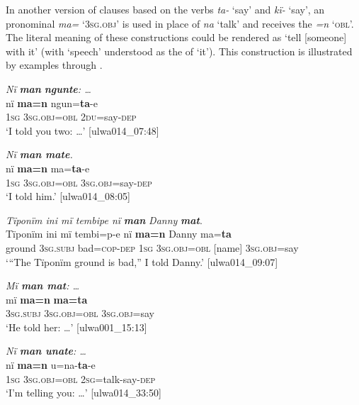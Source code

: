 In another version of  clauses based on the verbs \textit{ta-} ‘say’ and \textit{kï-} ‘say’, an  pronominal  \textit{ma=} ‘\textsc{3sg.obj}’ is used in place of \textit{na} ‘talk’ and receives the  \textit{=n} ‘\textsc{obl}’. The literal meaning of these constructions could be rendered as ‘tell [someone] with it’ (with ‘speech’ understood as the  of ‘it’). This construction is illustrated by examples  through .

\ea%
    \label{ex:syntax:207}
          \textit{Nï} \textbf{\textit{man}} \textbf{\textit{ngunte}}\textit{: …}\\
\gll    nï    \textbf{ma=n}      ngun=\textbf{ta}{}-e\\
    1\textsc{sg}  3\textsc{sg.obj=obl}  \textsc{2du}=say-\textsc{dep}\\
\glt `I told you two: …’ [ulwa014\_07:48]
\z

\ea%
    \label{ex:syntax:208}
          \textit{Nï \textbf{man mate}.}\\
\gll nï    \textbf{ma=n}      ma=\textbf{ta}{}-e\\
    1\textsc{sg}  3\textsc{sg.obj=obl}  3\textsc{sg.obj}=say-\textsc{dep}\\
\glt `I told him.’ [ulwa014\_08:05]
\z

\ea%
    \label{ex:syntax:209}
          \textit{Tïponïm ini mï tembipe nï} \textbf{\textit{man}} \textit{Danny} \textbf{\textit{mat}}.\\
\gll Tïponïm  ini    mï      tembi=p-e    nï    \textbf{ma=n} Danny  ma=\textbf{ta}\\
    [place]    ground  \textsc{3sg.subj}  bad=\textsc{cop{}-dep}  \textsc{1sg} 3\textsc{sg.obj}=\textsc{obl}     [name]  3\textsc{sg.obj=}say\\
\glt `“The Tïponïm ground is bad,” I told Danny.’ [ulwa014\_09:07]
\z

\ea%
    \label{ex:syntax:210}
          \textit{Mï \textbf{man mat}: …}\\
\gll    mï      \textbf{ma=n}      \textbf{ma=ta}\\
    3\textsc{sg.subj}  \textsc{3sg.obj=obl}  \textsc{3sg.obj}=say\\
\glt `He told her: …’ [ulwa001\_15:13]
\z

\ea%
    \label{ex:syntax:211}
          \textit{Nï \textbf{man unate}: …}\\
\gll nï    \textbf{ma=n}      u=na-\textbf{ta}-e\\
    1\textsc{sg}  \textsc{3sg.obj=obl}  \textsc{2sg}=talk-say-\textsc{dep}\\
\glt `I’m telling you: …’ [ulwa014\_33:50]
\z

